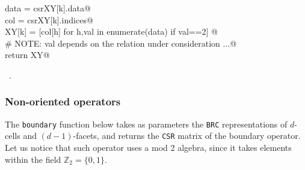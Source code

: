 \documentclass[11pt,oneside]{article}    %
\def\Z{\mathbb{Z}}
\begin{document}
\begin{flushleft}
\begin{list}{}{}
\mbox{}\verb@            data = csrXY[k].data@\\
\mbox{}\verb@            col = csrXY[k].indices@\\
\mbox{}\verb@            XY[k] = [col[h] for h,val in enumerate(data) if val==2] @\\
\mbox{}\verb@            # NOTE: val depends on the relation under consideration ...@\\
\mbox{}\verb@        return XY@\\
\mbox{}\verb@@{\NWsep}
\end{list}
\vspace{-1ex}
\footnotesize\addtolength{\baselineskip}{-1ex}
\begin{list}{}{\setlength{\itemsep}{-\parsep}\setlength{\itemindent}{-\leftmargin}}
\item \NWtxtMacroRefIn\ .
\end{list}
\end{flushleft}


\subsubsection{Non-oriented operators}

The \texttt{boundary} function below takes as parameters the \texttt{BRC} representations of $d$-cells and $(d-1)$-facets, and returns the \texttt{CSR} matrix of the boundary operator. Let us notice that such operator uses a mod 2 algebra, since it takes elements within the field $\Z_2=\{0,1\}$.
\end{document}
